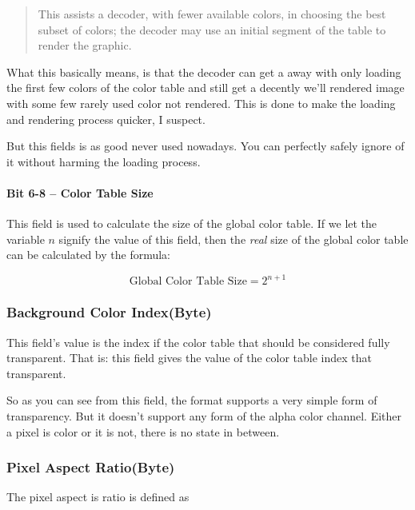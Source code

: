 \begin{refsection}
  \begin{quote}
    This assists a decoder, with fewer available colors, in choosing
    the best subset of colors; the decoder may use an initial segment
    of the table to render the graphic.
  \end{quote}

  What this basically means, is that the decoder can get a away with
  only loading the first few colors of the color table and still get a
  decently we'll rendered image with some few rarely used color not
  rendered. This is done to make the loading and rendering process
  quicker, I suspect.

  But this fields is as good never used nowadays. You can perfectly
  safely ignore of it without harming the loading process.

  \paragraph{Bit 6-8 -- Color Table Size}

  This field is used to calculate the size of the global color
  table. If we let the variable $n$ signify the value of this field,
  then the \textit{real} size of the global color table can be
  calculated by the formula:

  \begin{equation*}
    \textrm{Global Color Table Size} = 2^{n + 1}
  \end{equation*}

  \subsubsection{Background Color Index(Byte)}

  This field's value is the index if the color table that should be
  considered fully transparent. That is: this field gives the value of
  the color table index that transparent.

  So as you can see from this field, the \gif format supports a very
  simple form of transparency. But it doesn't support any form of the
  alpha color channel. Either a pixel is color or it is not, there is
  no state in between.

  \subsubsection{Pixel Aspect Ratio(Byte)}

  The pixel aspect is ratio is defined as


\end{refsection}
